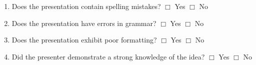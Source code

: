 \documentclass[letterpaper, 10pt]{article} %
\begin{document}
{\begin{enumerate}
\begin{itemize}
\renewcommand{\labelitemi}{$\Box$}

\setlength{\itemsep}{.5pt}

\item Introduction and motivation

\item Description of technique 

\item Technical diagrams

\item Program screenshots

\item Mathematical notation

\item Tables of data

\item Data visualizations

\item Results analysis

\item Related work 

\item Conclusion 

\item Future work 

\item Other components of a presentation

\end{itemize}

\item Does the presentation contain spelling mistakes? \hspace*{.05in}
  $\Box$ Yes \hspace*{.05in} $\Box$ No

\item Does the presentation have errors in grammar? \hspace*{.05in}
  $\Box$ Yes \hspace*{.05in} $\Box$ No

\item Does the presentation exhibit poor formatting? \hspace*{.05in}
  $\Box$ Yes \hspace*{.05in} $\Box$ No

\item Did the presenter demonstrate a strong knowledge of the
  idea? \hspace*{.05in} $\Box$ Yes \hspace*{.05in} $\Box$ No


\end{enumerate}}
\end{document}
